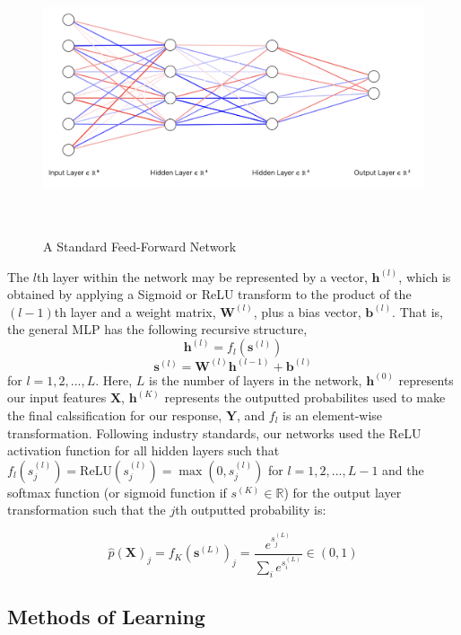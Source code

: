\documentclass [MAS] {uclathes}
\begin{document}
\begin{figure}[h]
\centering
\includegraphics[height = 80mm, width=130mm]{imgs/ffn.png}
\caption{A Standard Feed-Forward Network}
\label{fig:ffn}
\end{figure}

The $l$th layer within the network may be represented by a vector, $\mathbf{h}^{(l)}$, which is obtained by applying a Sigmoid or ReLU transform to the product of the $(l-1)$th layer and a weight matrix, $\mathbf{W}^{(l)}$, plus a bias vector, $\mathbf{b}^{(l)}$. That is, the general MLP has the following recursive structure, $$\mathbf{h}^{(l)} = f_l(\mathbf{s}^{(l)})$$
$$\mathbf{s}^{(l)} = \mathbf{W}^{(l)}\mathbf{h}^{(l-1)} + \mathbf{b}^{(l)}$$ for $l=1, 2, ..., L$. Here, $L$ is the number of layers in the network, $\mathbf{h}^{(0)}$ represents our input features $\mathbf{X}$, $\mathbf{h}^{(K)}$ represents the outputted probabilites used to make the final calssification for our response, $\mathbf{Y}$, and $f_l$ is an element-wise transformation. Following industry standards, our networks used the ReLU activation function for all hidden layers such that $f_l(s^{(l)}_j) = \text{ReLU}(s^{(l)}_j) = \max(0, s^{(l)}_j)$ for $l=1, 2, ..., L-1$ and the softmax function (or sigmoid function if $s^{(K)} \in \mathbb{R}$) for the output layer transformation such that the $j$th outputted probability is:

$$\hat{p}(\mathbf{X})_j = f_K(\mathbf{s}^{(L)})_j = \frac{e^{s^{(L)}_j}}{\sum_i e^{s^{(L)}_i}} \in (0, 1)$$

\subsection{Methods of Learning}
\end{document}
